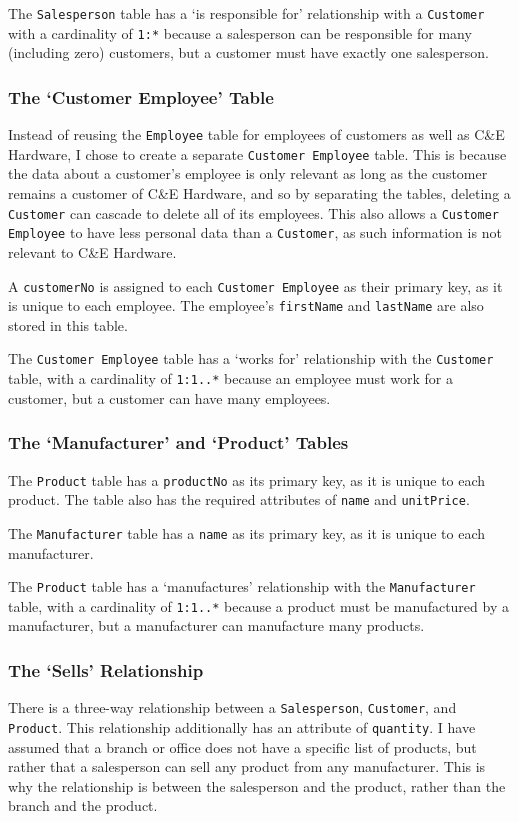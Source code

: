 \documentclass{article}
\begin{document}
The \texttt{Salesperson} table has a `is responsible for' relationship with a \texttt{Customer} with a cardinality of \texttt{1:*} because a salesperson can be responsible for many (including zero) customers, but a customer must have exactly one salesperson.

\subsubsection{The `Customer Employee' Table}
Instead of reusing the \texttt{Employee} table for employees of customers as well as C\&E Hardware, I chose to create a separate \texttt{Customer Employee} table. This is because the data about a customer's employee is only relevant as long as the customer remains a customer of C\&E Hardware, and so by separating the tables, deleting a \texttt{Customer} can cascade to delete all of its employees. This also allows a \texttt{Customer Employee} to have less personal data than a \texttt{Customer}, as such information is not relevant to C\&E Hardware.

A \texttt{customerNo} is assigned to each \texttt{Customer Employee} as their primary key, as it is unique to each employee. The employee's \texttt{firstName} and \texttt{lastName} are also stored in this table.

The \texttt{Customer Employee} table has a `works for' relationship with the \texttt{Customer} table, with a cardinality of \texttt{1:1..*} because an employee must work for a customer, but a customer can have many employees.

\subsubsection{The `Manufacturer' and `Product' Tables}
The \texttt{Product} table has a \texttt{productNo} as its primary key, as it is unique to each product. The table also has the required attributes of \texttt{name} and \texttt{unitPrice}.

The \texttt{Manufacturer} table has a \texttt{name} as its primary key, as it is unique to each manufacturer.

The \texttt{Product} table has a `manufactures' relationship with the \texttt{Manufacturer} table, with a cardinality of \texttt{1:1..*} because a product must be manufactured by a manufacturer, but a manufacturer can manufacture many products.

\subsubsection{The `Sells' Relationship}
There is a three-way relationship between a \texttt{Salesperson}, \texttt{Customer}, and \texttt{Product}. This relationship additionally has an attribute of \texttt{quantity}. I have assumed that a branch or office does not have a specific list of products, but rather that a salesperson can sell any product from any manufacturer. This is why the relationship is between the salesperson and the product, rather than the branch and the product.
\end{document}
